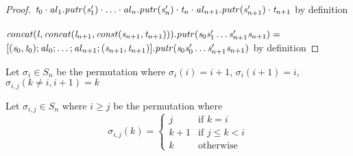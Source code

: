 \begin{lemma}
\begin{proof}
$\mathit{t}_0\cdot\mathit{al}_1.\mathit{putr}(\mathit{s}_1')\cdot\ldots\cdot\mathit{al}_n.\mathit{putr}(\mathit{s}_n')\cdot\mathit{t}_n\cdot\mathit{al}_{n+1}.\mathit{putr}(\mathit{s}_{n+1}')\cdot\mathit{t}_{n+1}$ by definition\\
\\
$\mathit{concat}(\mathit{l},\mathit{concat}(\mathit{l}_{n+1},\mathit{const}(\mathit{s}_{n+1},\mathit{t}_{n+1}))).\mathit{putr}
(\mathit{s}_0\mathit{s}_1'\ldots\mathit{s}_{n+1}'\mathit{s}_{n+1}) =$\\
$[(\mathit{s}_0,\mathit{t}_0);\mathit{al}_0;\ldots;\mathit{al}_{n+1};(\mathit{s}_{n+1},\mathit{t}_{n+1})].\mathit{putr}(\mathit{s}_0\mathit{s}_0'\ldots\mathit{s}_{n+1}'\mathit{s}_{n+1})$ by definition
\end{proof}
\end{lemma}

\begin{definition}
Let $\sigma_{i} \in S_n$ be the permutation where
$\sigma_{i}(i) = i+1$, $\sigma_{i}(i+1) = i$, $\sigma_{i,j}(k\neq i,i+1) = k$
\end{definition}

\begin{definition}
Let $\sigma_{i,j} \in S_n$ where $i\geq j$ be the permutation where
\[
  \sigma_{i,j}(k)=
    \begin{cases}
      j& \text{if } k=i\\
      k+1& \text{if } j\leq k<i\\
      k& \text{otherwise}
    \end{cases}
\]
\end{definition}

